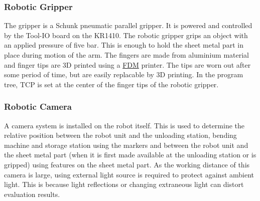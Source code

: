 \subsubsection{Robotic Gripper}
The gripper is a Schunk pneumatic parallel gripper. It is powered and controlled by the Tool-IO board on the KR1410.
The robotic gripper grips an object with an applied pressure of five bar. This is enough to hold the sheet metal part
in place during motion of the arm. 
The fingers are made from aluminium material and finger tips are 3D printed using a \hyperref[acro:FDM]{FDM} printer. The tips are worn out
after some period of time, but are easily replacable by 3D printing.
In the program tree, TCP is set at the center of the finger tips of the robotic gripper.


\subsubsection{Robotic Camera}
A camera system is installed on the robot itself. This is used to determine the relative
position between the robot unit and the unloading station, bending machine and storage station using the markers
and between the robot unit and the sheet metal part (when it is first made available at the
unloading station or is gripped) using features on the sheet metal part.
As the working distance of this camera is large, using external light source is required to protect against ambient light. 
This is because light reflections or changing extraneous light can distort evaluation results.
